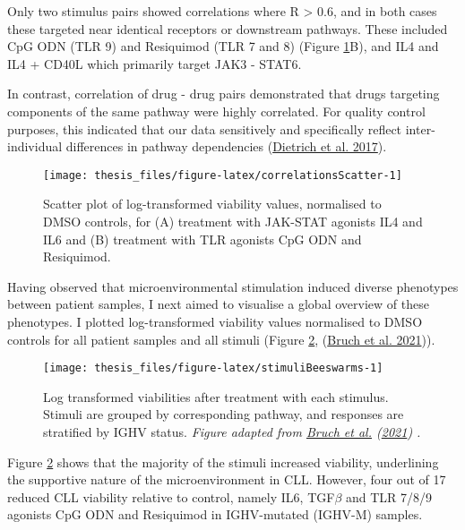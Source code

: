 \documentclass[11pt, a4paper, twosided]{book}
\begin{document}
Only two stimulus pairs showed correlations where R \textgreater{} 0.6, and in both cases these targeted near identical receptors or downstream pathways. These included CpG ODN (TLR 9) and Resiquimod (TLR 7 and 8) (Figure \ref{fig:correlationsScatter}B), and IL4 and IL4 + CD40L which primarily target JAK3 - STAT6.

In contrast, correlation of drug - drug pairs demonstrated that drugs targeting components of the same pathway were highly correlated. For quality control purposes, this indicated that our data sensitively and specifically reflect inter-individual differences in pathway dependencies (\protect\hyperlink{ref-JCIpaper}{Dietrich et al. 2017}).


\begin{figure}

{\centering \texttt{[image: thesis\_files/figure-latex/correlationsScatter-1]} 

}

\caption{Scatter plot of log-transformed viability values, normalised to DMSO controls, for (A) treatment with JAK-STAT agonists IL4 and IL6 and (B) treatment with TLR agonists CpG ODN and Resiquimod.}\label{fig:correlationsScatter}
\end{figure}
Having observed that microenvironmental stimulation induced diverse phenotypes between patient samples, I next aimed to visualise a global overview of these phenotypes. I plotted log-transformed viability values normalised to DMSO controls for all patient samples and all stimuli (Figure \ref{fig:stimuliBeeswarms}, (\protect\hyperlink{ref-Giles2021}{Bruch et al. 2021})).


\begin{figure}

{\centering \texttt{[image: thesis\_files/figure-latex/stimuliBeeswarms-1]} 

}

\caption{Log transformed viabilities after treatment with each stimulus. Stimuli are grouped by corresponding pathway, and responses are stratified by IGHV status. \emph{Figure adapted from \protect\hyperlink{ref-Giles2021}{Bruch et al.} (\protect\hyperlink{ref-Giles2021}{2021}) .}}\label{fig:stimuliBeeswarms}
\end{figure}
Figure \ref{fig:stimuliBeeswarms} shows that the majority of the stimuli increased viability, underlining the supportive nature of the microenvironment in CLL. However, four out of 17 reduced CLL viability relative to control, namely IL6, TGF\(\beta\) and TLR 7/8/9 agonists CpG ODN and Resiquimod in IGHV-mutated (IGHV-M) samples.
\end{document}
